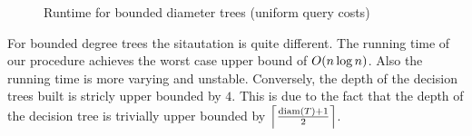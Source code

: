 \begin{figure}[!h]
\centering
{}
\caption{Runtime for bounded diameter trees (uniform query costs)}
\label{fig:bounded_diameter_uniform_time}
\end{figure}

\FloatBarrier
For bounded degree trees the sitautation is quite different. The running time of our procedure achieves the worst case upper bound of $O\mathopen{}\left( n\log n \right)$. Also the running time is more varying and unstable. Conversely, the depth of the decision trees built is stricly upper bounded by $4$. This is due to the fact that the depth of the decision tree is trivially upper bounded by $\mathopen{}\left\lceil \frac{\operatorname{diam}\mathopen{}\left( T \right)+1}{2} \right\rceil$. 
